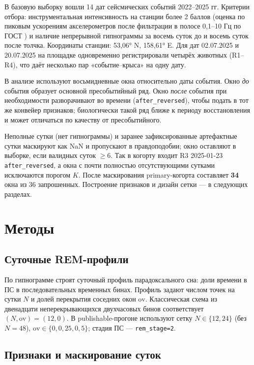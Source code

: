 \documentclass{article}
\begin{document}
В базовую выборку вошли 14 дат сейсмических событий 2022–2025 гг. Критерии отбора: инструментальная интенсивность на станции более 2 баллов (оценка по пиковым ускорениям акселерометров после фильтрации в полосе 0,1–10 Гц по ГОСТ \cite{GOST2017}) и наличие непрерывной гипнограммы за восемь суток до и восемь суток после толчка. Координаты станции: 53,06° N, 158,61° E. Для дат 02.07.2025 и 20.07.2025 на площадке одновременно регистрировали четырёх животных (R1–R4), что даёт несколько пар «событие–крыса» на одну дату.

В анализе используют восьмидневные окна относительно даты события. Окно \emph{до} события образует основной пресобытийный ряд. Окно \emph{после} события при необходимости разворачивают во времени (\texttt{after\_reversed}), чтобы подать в тот же конвейер признаков; биологически такой ряд ближе к периоду восстановления и может отличаться по качеству от пресобытийного.

Неполные сутки (нет гипнограммы) и заранее зафиксированные артефактные сутки маскируют как NaN и пропускают в правдоподобии; окно оставляют в выборке, если валидных суток \(\ge 6\). Так в когорту входит R3 2025-01-23 \texttt{after\_reversed}, а окна с почти полностью отсутствующими сутками исключаются порогом \(K\). После маскирования primary-когорта составляет \textbf{34} окна из 36 запрошенных. Построение признаков и дизайн сетки --- в следующих разделах.


\section{Методы}

\subsection{Суточные REM-профили}

По гипнограмме строят суточный профиль парадоксального сна: доли времени в ПС в последовательных временных бинах. Профиль задают числом точек на сутки \(N\) и долей перекрытия соседних окон \(\mathrm{ov}\). Классическая схема из двенадцати неперекрывающихся двухчасовых бинов соответствует \((N,\mathrm{ov})=(12,0)\). В publishable-прогоне используют сетку \(N\in\{12,24\}\) (без \(N=48\)), \(\mathrm{ov}\in\{0,0{,}25,0{,}5\}\); стадия ПС --- \texttt{rem\_stage=2}.

\subsection{Признаки и маскирование суток}
\end{document}
